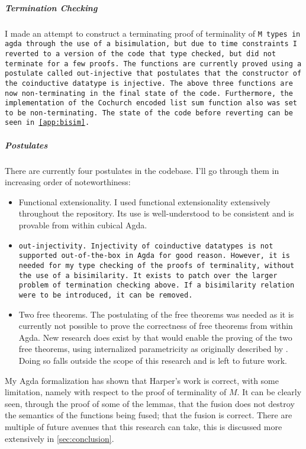 \subparagraph{Termination Checking}
I made an attempt to construct a terminating proof of terminality of \tt{M} types in agda through the use of a bisimulation, but due to time constraints I reverted to a version of the code that type checked, but did not terminate for a few proofs.
The functions are currently proved using a postulate called \tt{out-injective} that postulates that the constructor of the coinductive datatype is injective.
The above three functions are now non-terminating in the final state of the code.
Furthermore, the implementation of the Cochurch encoded list \tt{sum} function also was set to be non-terminating.
The state of the code before reverting can be seen in \autoref{app:bisim}.

\subparagraph{Postulates}
There are currently four postulates in the codebase.
I'll go through them in increasing order of noteworthiness:
\begin{itemize}[noitemsep]
  \item Functional extensionality.
  I used functional extensionality extensively throughout the repository.
  Its use is well-understood to be consistent and is provable from within cubical Agda.
  \item \tt{out}-injectivity.  Injectivity of coinductive datatypes is not supported out-of-the-box in Agda for good reason.
  However, it is needed for my type checking of the proofs of terminality, without the use of a bisimilarity.
  It exists to patch over the larger problem of termination checking above.
  If a bisimilarity relation were to be introduced, it can be removed.
  \item Two free theorems.
  The postulating of the free theorems was needed as it is currently not possible to prove the correctness of free theorems from within Agda.
  New research does exist by \cite{Muylder2024} that would enable the proving of the two free theorems, using internalized parametricity as originally described by \cite{Bernardy2012}.
  Doing so falls outside the scope of this research and is left to future work.
\end{itemize}

My Agda formalization has shown that Harper's work is correct, with some limitation, namely with respect to the proof of terminality of $M$.
It can be clearly seen, through the proof of some of the lemmas, that the fusion does not destroy the semantics of the functions being fused; that the fusion is correct.
There are multiple of future avenues that this research can take, this is discussed more extensively in \autoref{sec:conclusion}.
